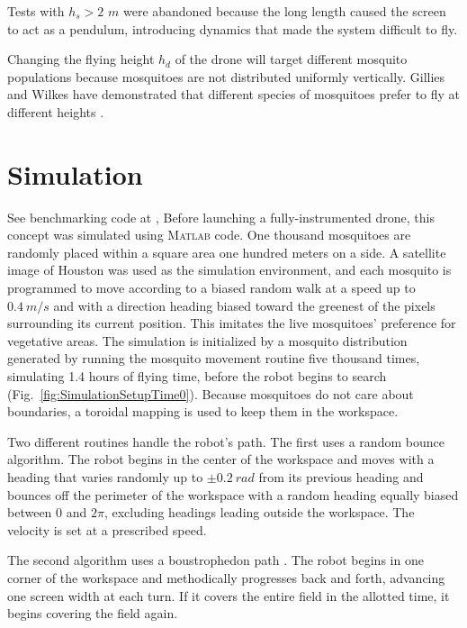 \documentclass[letterpaper, 10 pt, conference]{ieeeconf}  %
\begin{document}
 Tests with $h_s > 2$ $m$ were abandoned because the long length caused the screen to act as a pendulum, introducing dynamics that made the system difficult to fly.
 
Changing the flying height $h_d$ of the drone will target different mosquito populations because mosquitoes are not distributed uniformly vertically. 
 Gillies and Wilkes have demonstrated that different species of mosquitoes prefer to fly at different heights \cite{gillies1976vertical}. 


 
    \section{Simulation}
    
    See benchmarking code at \cite{Burbage2016matlab},
   Before launching a fully-instrumented drone, this concept was simulated using \textsc{Matlab} code.  One thousand mosquitoes are randomly placed within a square area one hundred meters on a side.  A satellite image of Houston was used as the simulation environment, and each mosquito is programmed to move according to a biased random walk at a speed up to $0.4~ m/s$ and with a direction heading biased toward the greenest of the pixels surrounding its current position.  This imitates the live mosquitoes' preference for vegetative areas.  
   The simulation is initialized by a mosquito distribution generated by running the mosquito movement routine  five thousand times, simulating 1.4 hours of flying time, before the robot begins to search (Fig.~\ref{fig:SimulationSetupTime0}).  Because mosquitoes do not care about boundaries, a toroidal mapping is used to keep them in the workspace.  
    
Two different routines handle the robot's path.  The first uses a random bounce algorithm.  The robot begins in the center of the workspace and moves with a heading that varies randomly up to $\pm 0.2~ rad$ from its previous heading and bounces off the perimeter of the workspace with a random heading equally biased between 0 and $2\pi$, excluding headings leading outside the workspace.  The velocity is set at a prescribed speed.

The second algorithm uses a boustrophedon path \cite{Choset2001}.  The robot begins in one corner of the workspace and methodically progresses back and forth, advancing one screen width at each turn.  If it covers the entire field in the allotted time, it begins covering the field again.
\end{document}
